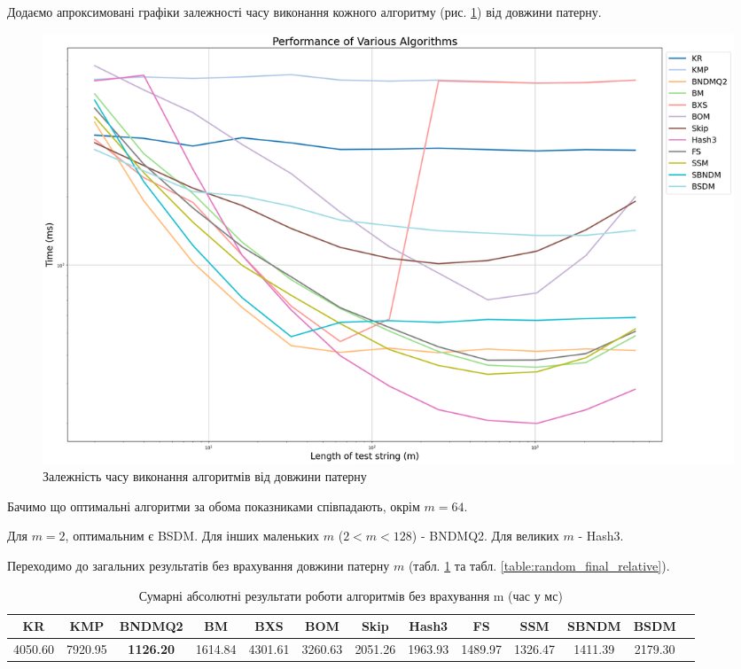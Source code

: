 \documentclass[a4paper,14pt]{extarticle} %
\begin{document}
				Додаємо апроксимовані графіки залежності часу виконання кожного алгоритму (рис. \ref{fig:random_graph}) від довжини патерну.

				\begin{figure}[H]
					\centering
					\includegraphics[width=1\textwidth]{images/random_graph.png}
					\caption{Залежність часу виконання алгоритмів від довжини патерну}
					\label{fig:random_graph}
				\end{figure}
				
				Бачимо що оптимальні алгоритми за обома показниками співпадають, окрім $m = 64$.

				Для $m=2$, оптимальним є BSDM. Для інших маленьких $m$ ($2<m<128$) - BNDMQ2. Для великих $m$ - Hash3.
				

				Переходимо до загальних результатів без врахування довжини патерну $m$ (табл. \ref{table:random_final_absolute} та табл. \ref{table:random_final_relative}).
				\begin{table}[H]
					\centering
					\scriptsize
					\begin{tabular}{|c|c|c|c|c|c|c|c|c|c|c|c|c|}
					\hline
					\textbf{KR} & \textbf{KMP} & \textbf{BNDMQ2} & \textbf{BM} & \textbf{BXS} & \textbf{BOM} & \textbf{Skip} & \textbf{Hash3} & \textbf{FS} & \textbf{SSM} & \textbf{SBNDM} & \textbf{BSDM} \\
					\hline
					4050.60 & 7920.95 & \textbf{1126.20} & 1614.84 & 4301.61 & 3260.63 & 2051.26 & 1963.93 & 1489.97 & 1326.47 & 1411.39 & 2179.30 \\
					\hline
					\end{tabular}
					\caption{Сумарні абсолютні результати роботи алгоритмів без врахування m (час у мс)}
					\label{table:random_final_absolute}
				\end{table}
\end{document}
